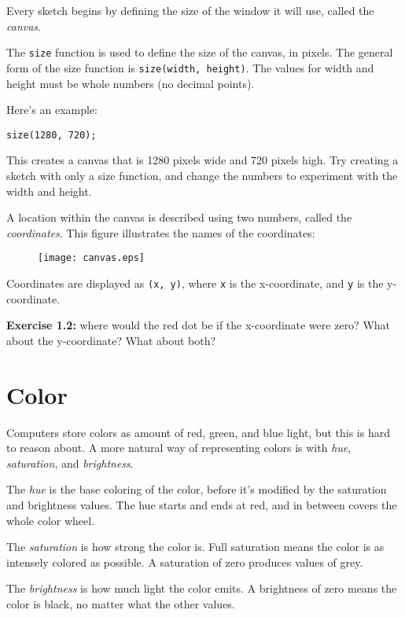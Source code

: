 \documentclass[
]{leaflet}
\begin{document}
Every sketch begins by defining the size of the window it will use, called the \textit{canvas}.

The \texttt{size} function is used to define the size of the canvas, in pixels.
The general form of the size function is \texttt{size(width, height)}.
The values for width and height must be whole numbers (no decimal points).

Here's an example:

\begin{lstlisting}
size(1280, 720);
\end{lstlisting}

This creates a canvas that is 1280 pixels wide and 720 pixels high.
Try creating a sketch with only a size function, and change the numbers to experiment with the width and height.

A location within the canvas is described using two numbers, called the \textit{coordinates}.
This figure illustrates the names of the coordinates:

\begin{figure}[!h]
  \centering
  \texttt{[image: canvas.eps]}
\end{figure}

Coordinates are displayed as \texttt{(x, y)}, where \texttt{x} is the x-coordinate, and \texttt{y} is the y-coordinate.

\textbf{Exercise 1.2:} where would the red dot be if the x-coordinate were zero?
What about the y-coordinate?
What about both?

\section{Color}

Computers store colors as amount of red, green, and blue light, but this is hard to reason about.
A more natural way of representing colors is with \textit{hue}, \textit{saturation}, and \textit{brightness}.

The \textit{hue} is the base coloring of the color, before it's modified by the saturation and brightness values.
The hue starts and ends at red, and in between covers the whole color wheel.

The \textit{saturation} is how strong the color is.
Full saturation means the color is as intensely colored as possible.
A saturation of zero produces values of grey.

The \textit{brightness} is how much light the color emits.
A brightness of zero means the color is black, no matter what the other values.
\end{document}
